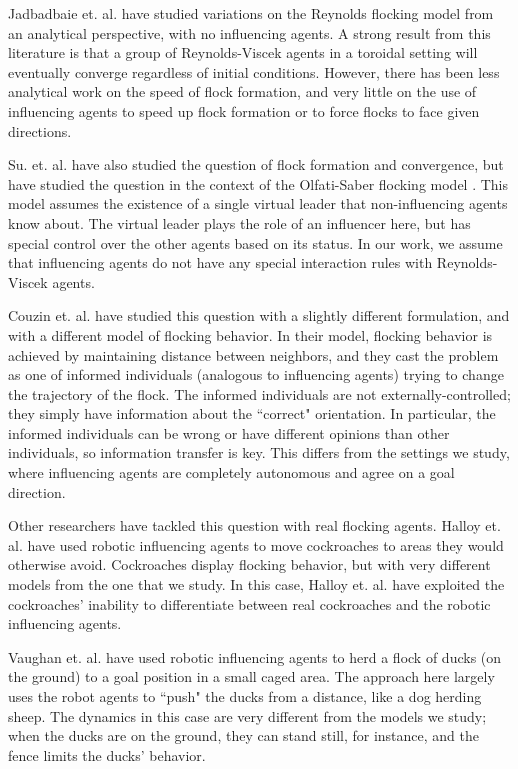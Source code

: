 Jadbadbaie et. al. \cite{jad2003convergence} have studied variations on the
Reynolds flocking model from an analytical perspective, with no influencing agents.
A strong result from this literature is that a group of Reynolds-Viscek agents in
a toroidal setting will eventually converge regardless of initial conditions.
However, there has been less analytical work on the speed of flock formation, and
very little on the use of influencing agents to speed up flock formation or to
force flocks to face given directions.

Su. et. al. \cite{su2009virtualleaderinformed} have also studied the question of
flock formation and convergence, but have studied the question in the context of
the Olfati-Saber flocking model \cite{olfati2006virtualleaderinformed}.
This model assumes the existence of a single virtual leader that non-influencing
agents know about.
The virtual leader plays the role of an influencer here, but has special control
over the other agents based on its status.
In our work, we assume that influencing agents do not have any special
interaction rules with Reynolds-Viscek agents.

Couzin et. al. \cite{couzin2005} have studied this question with a slightly
different
formulation, and with a different model of flocking behavior.
In their model, flocking behavior is achieved by maintaining distance between
neighbors, and they cast the problem as one of informed individuals (analogous to
influencing agents) trying to change the trajectory of the flock.
The informed individuals are not externally-controlled; they simply have
information about the ``correct" orientation.
In particular, the informed individuals can be wrong or have different opinions
than other individuals, so information transfer is key.
This differs from the settings we study, where influencing agents are completely
autonomous and agree on a goal direction.

Other researchers have tackled this question with real flocking agents.
Halloy et. al. \cite{Halloy2007} have used robotic influencing agents to move
cockroaches to areas they would otherwise avoid.
Cockroaches display flocking behavior, but with very different models from the
one that we study.
In this case, Halloy et. al. have exploited the cockroaches' inability to
differentiate between real cockroaches and the robotic influencing agents.

Vaughan et. al. \cite{vaughan98} have used robotic influencing agents to herd
a flock of ducks (on the ground) to a goal position in a small caged area.
The approach here largely uses the robot agents to ``push" the ducks from a
distance, like a dog herding sheep.
The dynamics in this case are very different from the models we study; when the
ducks are on the ground, they can stand still, for instance, and the fence
limits the ducks' behavior.

